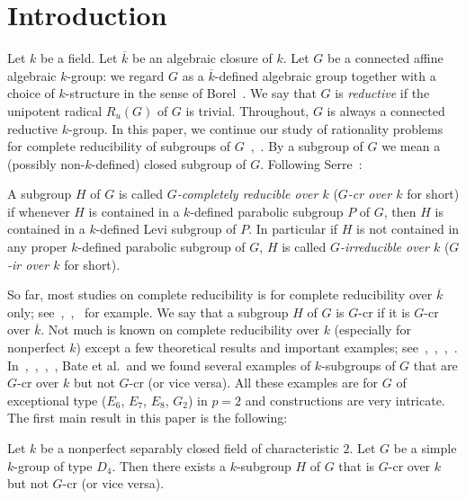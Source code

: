 \section{Introduction}
Let $k$ be a field. Let $\overline k$ be an algebraic closure of $k$. Let $G$ be a connected affine algebraic $k$-group: we regard $G$ as a $\overline k$-defined algebraic group together with a choice of $k$-structure in the sense of Borel~\cite[AG.~11]{Borel-AG-book}. We say that $G$ is \emph{reductive} if the unipotent radical $R_u(G)$ of $G$ is trivial. Throughout, $G$ is always a connected reductive $k$-group. In this paper, we continue our study of rationality problems for complete reducibility of subgroups of $G$~\cite{Uchiyama-Nonperfect-pre},~\cite{Uchiyama-Nonperfectopenproblem-pre}. By a subgroup of $G$ we mean a (possibly non-$k$-defined) closed subgroup of $G$. Following Serre~\cite[Sec.~3]{Serre-building}:
\begin{defn}
A subgroup $H$ of $G$ is called \emph{$G$-completely reducible over $k$} (\emph{$G$-cr over $k$} for short) if whenever $H$ is contained in a $k$-defined parabolic subgroup $P$ of $G$, then $H$ is contained in a $k$-defined Levi subgroup of $P$. In particular if $H$ is not contained in any proper $k$-defined parabolic subgroup of $G$, $H$ is called \emph{$G$-irreducible over $k$} (\emph{$G$-ir over $k$} for short). 
\end{defn}

So far, most studies on complete reducibility is for complete reducibility over $\overline k$ only; see~\cite{Liebeck-Seitz-memoir},~\cite{Stewart-nonGcr},~\cite{Thomas-irreducible-JOA} for example. We say that a subgroup $H$ of $G$ is $G$-cr if it is $G$-cr over $\overline k$. Not much is known on complete reducibility over $k$ (especially for nonperfect $k$) except a few theoretical results and important examples; see~\cite[Sec.~5]{Bate-geometric-Inventione},~\cite{Bate-cocharacter-Arx},~\cite{Uchiyama-Nonperfect-pre},~\cite{Uchiyama-Nonperfectopenproblem-pre}. In~\cite[Thm.~1.10]{Uchiyama-Separability-JAlgebra},~\cite[Thm.~1.8]{Uchiyama-Classification-pre},~\cite[Thm.~1.2]{Uchiyama-Nonperfect-pre},~\cite[Sec.~6]{Bate-separability-TransAMS}, Bate et al.~and we found several examples of $k$-subgroups of $G$ that are $G$-cr over $k$ but not $G$-cr (or vice versa). All these examples are for $G$ of exceptional type ($E_6$, $E_7$, $E_8$, $G_2$) in $p=2$ and constructions are very intricate. The first main result in this paper is the following:  

\begin{thm}\label{D4example}
Let $k$ be a nonperfect separably closed field of characteristic $2$. Let $G$ be a simple $k$-group of type $D_4$. Then there exists a $k$-subgroup $H$ of $G$ that is $G$-cr over $k$ but not $G$-cr (or vice versa).
\end{thm}


